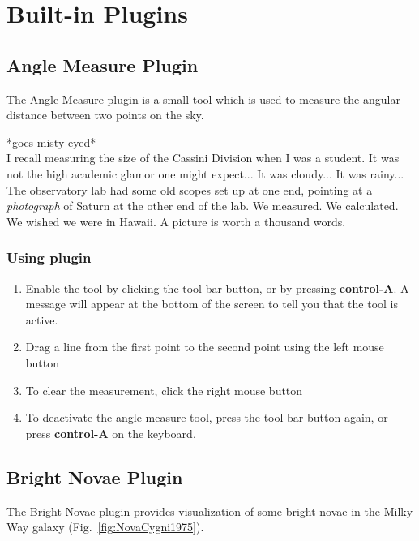 
\chapter{Built-in Plugins}
\label{ch:BuiltinPlugins}

\section{Angle Measure Plugin}
\label{sec:plugins:AngleMeasure}


The Angle Measure plugin is a small tool which is used to measure the
angular distance between two points on the sky. 

\small{*goes misty eyed*\\ 
I recall measuring the size of the Cassini Division when I was a student.
It was not the high academic glamor one might expect... It was cloudy...
It was rainy... The observatory lab had some old scopes set up at one
end, pointing at a \emph{photograph} of Saturn at the other end of the
lab. We measured. We calculated. We wished we were in Hawaii. A picture
is worth a thousand words.}

\subsection{Using plugin}
\label{sec:plugins:AngleMeasure:using}

\begin{enumerate}
\item
  Enable the tool by clicking the tool-bar button, or by pressing
  \textbf{control-A}. A message will appear at the bottom of the screen
  to tell you that the tool is active.
\item
  Drag a line from the first point to the second point using the left
  mouse button
\item
  To clear the measurement, click the right mouse button
\item
  To deactivate the angle measure tool, press the tool-bar button again,
  or press \textbf{control-A} on the keyboard.
\end{enumerate}

\section{Bright Novae Plugin}
\label{sec:plugins:BrightNovae}

The Bright Novae plugin provides visualization of some bright novae in
the Milky Way galaxy (Fig.~\ref{fig:NovaCygni1975}).

